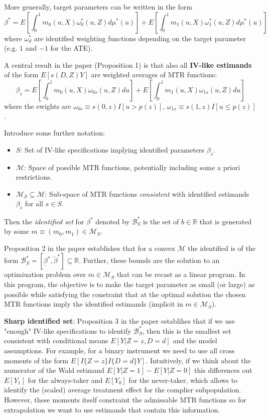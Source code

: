 \documentclass{article}
\begin{document}
More generally, target parameters can be written in the form
\begin{equation}
    \beta^* = E\left[\int_0^1 m_0(u,X)\omega_0^*(u,Z)d\mu^*(u)\right] + E\left[\int_0^1 m_1(u,X)\omega_1^*(u,Z)d\mu^*(u)\right]
\end{equation}
where $\omega_{d}^*$ are identified weighting functions depending on the target parameter (e.g. $1$ and $-1$ for the ATE).

A central result in the paper (Proposition 1) is that also all \textbf{IV-like estimands} of the form $E[s(D,Z)Y]$ are weighted averages of MTR functions:
\begin{equation}
    \beta_s = 
    E\left[\int_0^1 m_0(u,X)\omega_{0s}(u,Z)du\right] 
    + E\left[\int_0^1 m_1(u,X)\omega_{1s}(u,Z)du\right]
\end{equation}
where the ewights are $\omega_{0s} \equiv s(0,z)I[u>p(z)]$, $\omega_{1s} \equiv s(1,z)I[u\leq p(z)]$.

Introduce some further notation:
\begin{itemize}
    \item $S$: Set of IV-like specifications implying identified parameters $\beta_s$.
    \item $\mathcal{M}$: Space of possible MTR functions, potentially including some a priori restrictions.
    \item $\mathcal{M_S}\subseteq \mathcal{M}$: Sub-space of MTR functions \textit{consistent} with identified estimands $\beta_s$ for all $s\in S$.
\end{itemize}

Then the \textit{identified set} for $\beta^*$ denoted by $\mathcal{B}_S^*$ is the set of $b\in\mathbb{R}$ that is generated by some $m\equiv(m_0, m_1)\in \mathcal{M}_S$.

Proposition 2 in the paper establishes that for a convex $\mathcal{M}$ the identified is of the form $\mathcal{B}^*_S = [\underline{\beta}^*, \overleftarrow{\beta}^*]\subseteq \mathbb{R}$. 
Further, these bounds are the solution to an optimiuation problem over $m\in\mathcal{M}_S$ that can be recast as a linear program.
In this program, the objective is to make the target parameter as small (or large) as possible while satisfying the constraint that at the optimal solution the chosen MTR functions imply the identified estimands (implicit in $m\in\mathcal{M}_S$).

\textbf{Sharp identified set}: Proposition 3 in the paper establihes that if we use "enough" IV-like specifications to identify $\mathcal{B}^*_S$, then this is the smallest set consistent with conditional means $E[Y|Z=z, D=d]$ and the model assumptions.
For example, for a binary instrument we need to use all cross moments of the form $E[I\{Z=z\}I\{D=d\}Y]$.
Intuitively, if we think about the numerator of the Wald estimand $E[Y|Z=1] - E[Y|Z=0]$ this differences out $E[Y_1]$ for the always-taker and $E[Y_0]$ for the never-taker, which allows to identify the (scaled) average treatment effect for the complier subpopulation.
However, these moments itself constraint the admissable MTR functions so for extrapolation we want to use estimands that contain this information.
\end{document}
